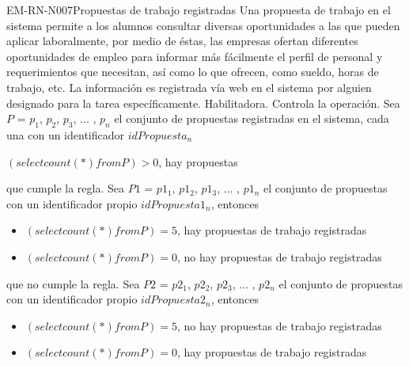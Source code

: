 \begin{BussinesRule}{EM-RN-N007}{Propuestas de trabajo registradas}
	\BRitem[Descripción:] Una propuesta de trabajo en el sistema permite a los alumnos consultar diversas oportunidades a las que pueden aplicar laboralmente, por medio de éstas, las empresas ofertan diferentes oportunidades de empleo para informar más fácilmente el perfil de personal y requerimientos que necesitan, así como lo que ofrecen, como sueldo, horas de trabajo, etc. La información es registrada vía web en el sistema por alguien designado para la tarea específicamente. 
	\BRitem[Tipo:] Habilitadora.
	\BRitem[Nivel:] Controla la operación.
	\BRitem[Sentencia: ] Sea $P$ = {$p_{1}$, $p_{2}$, $p_{3}$, ... , $p_{n}$} el conjunto de propuestas registradas en el sistema, cada una con un identificador $idPropuesta_{n}$  
	\begin{center}
		$(select count(*) from P) > 0$, hay propuestas
	\end{center}
	
	 que cumple la regla.
		Sea $P1$ = {$p1_{1}$, $p1_{2}$, $p1_{3}$, ... , $p1_{n}$} el conjunto de propuestas con un identificador propio $idPropuesta1_{n}$, entonces 
		\begin{itemize}
			\item $(select count(*) from P) = 5$, hay propuestas de trabajo registradas 
			\item $(select count(*) from P) = 0$, no hay propuestas de trabajo registradas 
		\end{itemize}
	 que no cumple la regla.
		Sea $P2$ = {$p2_{1}$, $p2_{2}$, $p2_{3}$, ... , $p2_{n}$} el conjunto de propuestas con un identificador propio $idPropuesta2_{n}$, entonces 
		\begin{itemize}
			\item $(select count(*) from P) = 5$, no hay propuestas de trabajo registradas 
			\item $(select count(*) from P) = 0$, hay propuestas de trabajo registradas 
		\end{itemize}
\end{BussinesRule}

